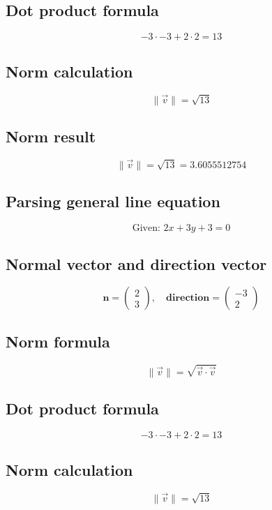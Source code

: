 \documentclass{article}
\begin{document}
\subsection*{ \vspace{1em} Dot product formula}
\[
-3 \cdot -3 + 2 \cdot 2 = 13
\]
\subsection*{ \vspace{1em} Norm calculation}
\[
\|\vec{v}\| = \sqrt{13}
\]
\subsection*{ \vspace{1em} Norm result}
\[
\|\vec{v}\| = \sqrt{13} = 3.6055512754
\]
\subsection*{ \vspace{1em} Parsing general line equation}
\[
\text{Given: } 2x + 3y + 3 = 0
\]
\subsection*{ \vspace{1em} Normal vector and direction vector}
\[
\mathbf{n} = \begin{pmatrix}2 \\ 3\end{pmatrix}, \quad
           \mathbf{direction} = \begin{pmatrix}-3 \\ 2\end{pmatrix}
\]
\subsection*{ \vspace{1em} Norm formula}
\[
\|\vec{v}\| = \sqrt{\vec{v} \cdot \vec{v}}
\]
\subsection*{ \vspace{1em} Dot product formula}
\[
-3 \cdot -3 + 2 \cdot 2 = 13
\]
\subsection*{ \vspace{1em} Norm calculation}
\[
\|\vec{v}\| = \sqrt{13}
\]
\end{document}
